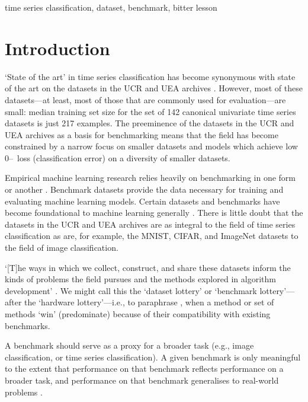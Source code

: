 \documentclass[twoside,11pt,preprint]{article}
\newcommand{\zo}{\mbox{0--\!1}~loss}
\begin{document}
\begin{keywords}
    time series classification, dataset, benchmark, bitter lesson
\end{keywords}


\section{Introduction} \label{sec-introduction}

`State of the art' in time series classification has become synonymous with state of the art on the datasets in the UCR and UEA archives \citep{UEA-2018,UCR-2019,bagnall_etal_2017,middlehurst_etal_2024,ruiz_etal_2021}. However, most of these datasets---at least, most of those that are commonly used for evaluation---are small: median training set size for the set of 142 canonical univariate time series datasets is just 217 examples. The preeminence of the datasets in the UCR and UEA archives as a basis for benchmarking means that the field has become constrained by a narrow focus on smaller datasets and models which achieve low {\zo} (classification error) on a diversity of smaller datasets.

Empirical machine learning research relies heavily on benchmarking in one form or another \citep{liao_etal_2021}. Benchmark datasets provide the data necessary for training and evaluating machine learning models. Certain datasets and benchmarks have become foundational to machine learning generally \citep{paullada_etal_2021}. There is little doubt that the datasets in the UCR and UEA archives are as integral to the field of time series classification as are, for example, the MNIST, CIFAR, and ImageNet datasets to the field of image classification.

`[T]he ways in which we collect, construct, and share these datasets inform the kinds of problems the field pursues and the methods explored in algorithm development' \citep{paullada_etal_2021}. We might call this the `dataset lottery' or `benchmark lottery'---after the `hardware lottery'---i.e., to paraphrase \citet{hooker_2021}, when a method or set of methods `win' (predominate) because of their compatibility with existing benchmarks.

A benchmark should serve as a proxy for a broader task (e.g., image classification, or time series classification). A given benchmark is only meaningful to the extent that performance on that benchmark reflects performance on a broader task, and performance on that benchmark generalises to real-world problems \citep{liao_etal_2021}.
\end{document}
